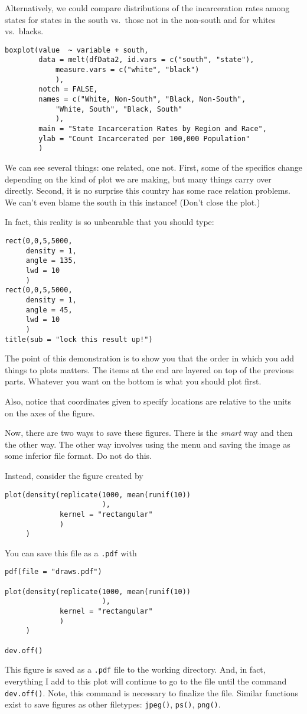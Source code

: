 Alternatively, we could compare distributions of the incarceration
rates among states for states in the south vs.\ those not in the
non-south and for whites vs.\ blacks.

\begin{verbatim}
boxplot(value  ~ variable + south,
        data = melt(dfData2, id.vars = c("south", "state"),
            measure.vars = c("white", "black")            
            ),
        notch = FALSE,
        names = c("White, Non-South", "Black, Non-South",
            "White, South", "Black, South"
            ),
        main = "State Incarceration Rates by Region and Race",
        ylab = "Count Incarcerated per 100,000 Population"
        )
\end{verbatim}

We can see several things: one \R{} related, one not. First, some of
the specifics change depending on the kind of plot we are making, but
many things carry over directly. Second, it is no surprise this
country has some race relation problems. We can't even blame the south
in this instance! (Don't close the plot.)

In fact, this reality is so unbearable that you should type:
\begin{verbatim}
rect(0,0,5,5000,
     density = 1,
     angle = 135,
     lwd = 10
     )
rect(0,0,5,5000,
     density = 1,
     angle = 45,
     lwd = 10
     )
title(sub = "lock this result up!")
\end{verbatim}
The point of this demonstration is to show you that the order in which
you add things to plots matters. The items at the end are layered on
top of the previous parts. Whatever you want on the bottom is what you
should plot first.

Also, notice that coordinates given to specify locations are relative
to the units on the axes of the figure.

Now, there are two ways to save these figures. There is the
\textit{smart} way and then the other way. The other way involves
using the menu and saving the image as some inferior file format. Do
not do this.

Instead, consider the figure created by
\begin{verbatim}
plot(density(replicate(1000, mean(runif(10))
                       ),
             kernel = "rectangular"
             )
     )
\end{verbatim}

You can save this file as a \texttt{.pdf} with 
\begin{verbatim}
pdf(file = "draws.pdf")

plot(density(replicate(1000, mean(runif(10))
                       ),
             kernel = "rectangular"
             )
     )

dev.off()
\end{verbatim}
This figure is saved as a \texttt{.pdf} file to the working
directory. And, in fact, everything I add to this plot will continue
to go to the file until the command \texttt{dev.off()}. Note, this
command is necessary to finalize the file. Similar functions exist to
save figures as other filetypes: \texttt{jpeg()}, \texttt{ps()},
\texttt{png()}.

